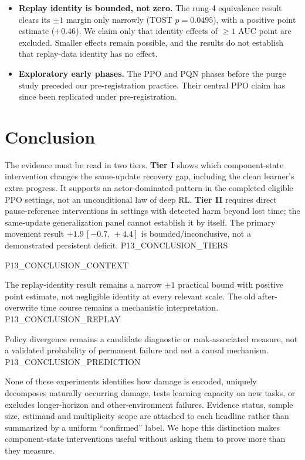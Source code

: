 \documentclass[10pt]{article} %
\newcommand{\ci}[2]{\,[#1,\,#2]}
\begin{document}
\begin{itemize}
\item \textbf{Replay identity is bounded, not zero.} The rung-4 equivalence result clears its $\pm1$ margin only narrowly (TOST $p=0.0495$), with a positive point estimate ($+0.46$). We claim only that identity effects of $\geq1$ AUC point are excluded. Smaller effects remain possible, and the results do not establish that replay-data identity has no effect.
\item \textbf{Exploratory early phases.} The PPO and PQN phases before the purge study preceded our pre-registration practice. Their central PPO claim has since been replicated under pre-registration.
\end{itemize}

\section{Conclusion}

The evidence must be read in two tiers. \textbf{Tier I} shows which component-state intervention changes the same-update recovery gap, including the clean learner's extra progress. It supports an actor-dominated pattern in the completed eligible PPO settings, not an unconditional law of deep RL. \textbf{Tier II} requires direct pause-reference interventions in settings with detected harm beyond lost time; the same-update generalization panel cannot establish it by itself. The primary movement result $+1.9\ci{-0.7}{+4.4}$ is bounded/inconclusive, not a demonstrated persistent deficit. P13_CONCLUSION_TIERS

P13_CONCLUSION_CONTEXT

The replay-identity result remains a narrow $\pm1$ practical bound with positive point estimate, not negligible identity at every relevant scale. The old after-overwrite time course remains a mechanistic interpretation. P13_CONCLUSION_REPLAY

Policy divergence remains a candidate diagnostic or rank-associated measure, not a validated probability of permanent failure and not a causal mechanism. P13_CONCLUSION_PREDICTION

None of these experiments identifies how damage is encoded, uniquely decomposes naturally occurring damage, tests learning capacity on new tasks, or excludes longer-horizon and other-environment failures. Evidence status, sample size, estimand and multiplicity scope are attached to each headline rather than summarized by a uniform ``confirmed'' label. We hope this distinction makes component-state interventions useful without asking them to prove more than they measure.
\end{document}

